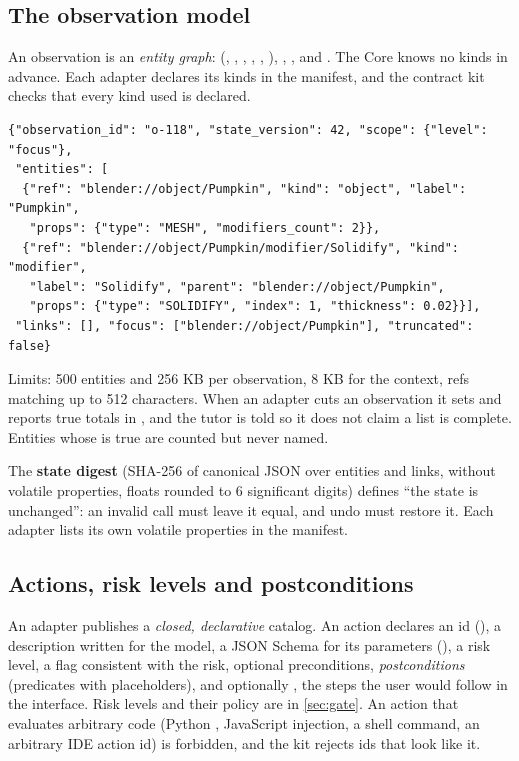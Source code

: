 \subsection{The observation model}

An observation is an \emph{entity graph}:  (, , , , , ), , ,  and . The Core knows no kinds in advance. Each adapter declares its kinds in the manifest, and the contract kit checks that every kind used is declared.

\begin{lstlisting}[language={}]
{"observation_id": "o-118", "state_version": 42, "scope": {"level": "focus"},
 "entities": [
  {"ref": "blender://object/Pumpkin", "kind": "object", "label": "Pumpkin",
   "props": {"type": "MESH", "modifiers_count": 2}},
  {"ref": "blender://object/Pumpkin/modifier/Solidify", "kind": "modifier",
   "label": "Solidify", "parent": "blender://object/Pumpkin",
   "props": {"type": "SOLIDIFY", "index": 1, "thickness": 0.02}}],
 "links": [], "focus": ["blender://object/Pumpkin"], "truncated": false}
\end{lstlisting}

Limits: 500 entities and 256 KB per observation, 8 KB for the context, refs matching  up to 512 characters. When an adapter cuts an observation it sets  and reports true totals in , and the tutor is told so it does not claim a list is complete. Entities whose  is true are counted but never named.

The \textbf{state digest} (SHA-256 of canonical JSON over entities and links, without volatile properties, floats rounded to 6 significant digits) defines ``the state is unchanged'': an invalid call must leave it equal, and undo must restore it. Each adapter lists its own volatile properties in the manifest.

\subsection{Actions, risk levels and postconditions}

An adapter publishes a \emph{closed, declarative} catalog. An action declares an id (), a description written for the model, a JSON Schema for its parameters (), a risk level, a  flag consistent with the risk, optional preconditions, \emph{postconditions} (predicates with  placeholders), and optionally , the steps the user would follow in the interface. Risk levels and their policy are in \cref{sec:gate}. An action that evaluates arbitrary code (Python , JavaScript injection, a shell command, an arbitrary IDE action id) is forbidden, and the kit rejects ids that look like it.

